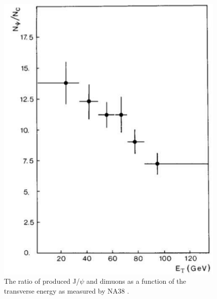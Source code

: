 \begin{figure}
  \includegraphics[width=\largefigwidth]{chap_QuarkoniaSurvey_figures/SPS_216}
  \caption[JPsiNA38]{The ratio of produced J/$\psi$  and dimuons as a function of the transverse energy as measured by NA38 \cite{NA38}.}
   \label{fig:JPsiAtSPSNA38}
\end{figure}



